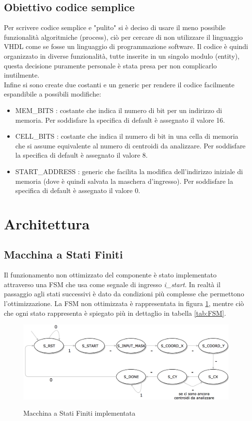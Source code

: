\documentclass{article}
\begin{document}
\subsection{Obiettivo codice semplice}
Per scrivere codice semplice e "pulito" si è deciso di usare il meno possibile funzionalità algoritmiche (process), ciò per cercare di non utilizzare il linguaggio VHDL come se fosse un linguaggio di programmazione software. Il codice è quindi organizzato in diverse funzionalità, tutte inserite in un singolo modulo (entity), questa decisione puramente personale è stata presa per non complicarlo inutilmente.\\
Infine si sono create due costanti e un generic per rendere il codice facilmente espandibile a possibili modifiche:
\begin{itemize}
\item MEM\_BITS : costante che indica il numero di bit per un indirizzo di memoria. Per soddisfare la specifica di default è assegnato il valore 16.
\item CELL\_BITS : costante che indica il numero di bit in una cella di memoria che si assume equivalente al numero di centroidi da analizzare. Per soddisfare la specifica di default è assegnato il valore 8.
\item START\_ADDRESS : generic che facilita la modifica dell'indirizzo iniziale di memoria (dove è quindi salvata la maschera d'ingresso). Per soddisfare la specifica di default è assegnato il valore 0.
\end{itemize}


\pagebreak
\section{Architettura}

\subsection{Macchina a Stati Finiti}
Il funzionamento non ottimizzato del componente è stato implementato attraverso una FSM che usa come segnale di ingresso \textit{i\_start}. In realtà il passaggio agli stati successivi è dato da condizioni più complesse che permettono l'ottimizzazione.
La FSM non ottimizzata è rappresentata in figura \ref{fig:FSM}, mentre ciò che ogni stato rappresenta è spiegato più in dettaglio in tabella \ref{tab:FSM}.

\begin{figure}[H]
\centering
\caption{Macchina a Stati Finiti implementata}
\includegraphics[width=1.0\textwidth]{FSM.png}
\label{fig:FSM}
\end{figure}
\end{document}
